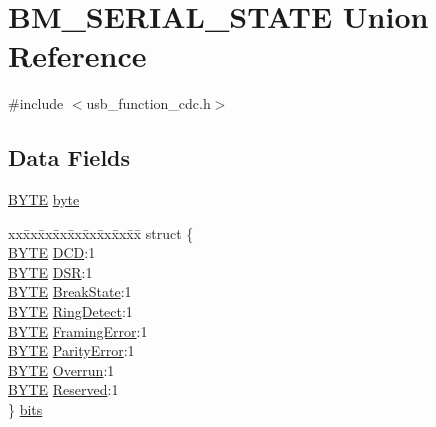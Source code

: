 \hypertarget{union_b_m___s_e_r_i_a_l___s_t_a_t_e}{}\section{B\+M\+\_\+\+S\+E\+R\+I\+A\+L\+\_\+\+S\+T\+A\+T\+E Union Reference}
\label{union_b_m___s_e_r_i_a_l___s_t_a_t_e}


{\ttfamily \#include $<$usb\+\_\+function\+\_\+cdc.\+h$>$}

\subsection*{Data Fields}
\begin{DoxyCompactItemize}
\item 
\hyperlink{_generic_type_defs_8h_a4ae1dab0fb4b072a66584546209e7d58}{B\+Y\+T\+E} \hyperlink{union_b_m___s_e_r_i_a_l___s_t_a_t_e_a4ec262e8432e722273b67cea923f72a6}{byte}
\item 
\begin{tabbing}
xx\=xx\=xx\=xx\=xx\=xx\=xx\=xx\=xx\=\kill
struct \{\\
\>\hyperlink{_generic_type_defs_8h_a4ae1dab0fb4b072a66584546209e7d58}{BYTE} \hyperlink{union_b_m___s_e_r_i_a_l___s_t_a_t_e_afe87040b1a8b87557c05974f1625389c}{DCD}:1\\
\>\hyperlink{_generic_type_defs_8h_a4ae1dab0fb4b072a66584546209e7d58}{BYTE} \hyperlink{union_b_m___s_e_r_i_a_l___s_t_a_t_e_aceb4871bfc100f0d5c3ae077caf71708}{DSR}:1\\
\>\hyperlink{_generic_type_defs_8h_a4ae1dab0fb4b072a66584546209e7d58}{BYTE} \hyperlink{union_b_m___s_e_r_i_a_l___s_t_a_t_e_adc18b99a72b94e6de778e6afdab6795a}{BreakState}:1\\
\>\hyperlink{_generic_type_defs_8h_a4ae1dab0fb4b072a66584546209e7d58}{BYTE} \hyperlink{union_b_m___s_e_r_i_a_l___s_t_a_t_e_aa0f142c94693826b4b5c1b5e3e89a4f4}{RingDetect}:1\\
\>\hyperlink{_generic_type_defs_8h_a4ae1dab0fb4b072a66584546209e7d58}{BYTE} \hyperlink{union_b_m___s_e_r_i_a_l___s_t_a_t_e_af272152f0bc7b21f6548002b5058f9b9}{FramingError}:1\\
\>\hyperlink{_generic_type_defs_8h_a4ae1dab0fb4b072a66584546209e7d58}{BYTE} \hyperlink{union_b_m___s_e_r_i_a_l___s_t_a_t_e_a40f7f53ea6fec0b134ac23234f790026}{ParityError}:1\\
\>\hyperlink{_generic_type_defs_8h_a4ae1dab0fb4b072a66584546209e7d58}{BYTE} \hyperlink{union_b_m___s_e_r_i_a_l___s_t_a_t_e_ae5fdd6177f09e3742ed44adae8cb028d}{Overrun}:1\\
\>\hyperlink{_generic_type_defs_8h_a4ae1dab0fb4b072a66584546209e7d58}{BYTE} \hyperlink{union_b_m___s_e_r_i_a_l___s_t_a_t_e_adba0129493ef67a85dd97e7e842ee410}{Reserved}:1\\
\} \hyperlink{union_b_m___s_e_r_i_a_l___s_t_a_t_e_a55739d8ea5df6673892a2bdb5c223006}{bits}\\

\end{tabbing}\end{DoxyCompactItemize}


